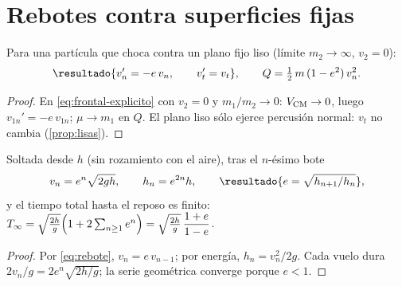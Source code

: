 \section{Rebotes contra superficies fijas}
\label{sec:rebotes}

\begin{proposicion}
\label{prop:rebote}
Para una partícula que choca contra un plano fijo liso (límite $m_{2}\to\infty$, $v_{2}=0$):
\begin{equation}
  \resultado{v_{n}'=-e\,v_{n},\qquad v_{t}'=v_{t}},\qquad
  Q=\tfrac12\,m\,(1-e^{2})\,v_{n}^{2} .
  \label{eq:rebote}
\end{equation}
\end{proposicion}

\begin{proof}
En \eqref{eq:frontal-explicito} con $v_{2}=0$ y $m_{1}/m_{2}\to0$: $V_{\mathrm{CM}}\to0$, luego $v_{1n}'=-e\,v_{1n}$; $\mu\to m_{1}$
en $Q$. El plano liso sólo ejerce percusión normal: $v_{t}$ no cambia (\cref{prop:lisas}).
\end{proof}

\begin{corolario}
\label{cor:bote}
Soltada desde $h$ (sin rozamiento con el aire), tras el $n$-ésimo bote
\begin{equation}
  v_{n}=e^{n}\sqrt{2gh},\qquad h_{n}=e^{2n}h,\qquad
  \resultado{e=\sqrt{h_{n+1}/h_{n}}} ,
\end{equation}
y el tiempo total hasta el reposo es finito:
$T_{\infty}=\sqrt{\tfrac{2h}{g}}\Bigl(1+2\sum_{n\ge1}e^{n}\Bigr)=\sqrt{\tfrac{2h}{g}}\,\dfrac{1+e}{1-e}$.
\end{corolario}

\begin{proof}
Por \eqref{eq:rebote}, $v_{n}=e\,v_{n-1}$; por energía, $h_{n}=v_{n}^{2}/2g$. Cada vuelo dura
$2v_{n}/g=2e^{n}\sqrt{2h/g}$; la serie geométrica converge porque $e<1$.
\end{proof}

